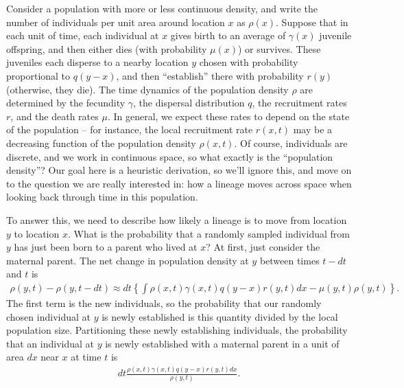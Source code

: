 \documentclass{article}
\begin{document}
Consider a population with more or less continuous density,
and write the number of individuals per unit area around location $x$ as $\rho(x)$.
Suppose that in each unit of time, each individual at $x$ 
gives birth to an average of $\gamma(x)$ juvenile offspring,
and then either dies (with probability $\mu(x)$) or survives.
These juveniles each disperse to a nearby location $y$
chosen with probability proportional to $q(y-x)$,
and then ``establish'' there with probability $r(y)$ (otherwise, they die).
The time dynamics of the population density $\rho$
are determined by the fecundity $\gamma$, the dispersal distribution $q$,
the recruitment rates $r$, and the death rates $\mu$.
In general, we expect these rates to depend on the state of the population
-- for instance, the local recruitment rate $r(x, t)$ may be a decreasing function
of the population density $\rho(x, t)$.
Of course, individuals are discrete, and we work in continuous space,
so what exactly is the ``population density''?
Our goal here is a heuristic derivation, so we'll ignore this,
and move on to the question we are really interested in:
how a lineage moves across space when looking back through time in this population.

To answer this, we need to describe how likely a lineage is to move from location $y$ to location $x$.
What is the probability that a randomly sampled individual from $y$
has just been born to a parent who lived at $x$?
At first, just consider the maternal parent.
The net change in population density at $y$ between times $t - dt$ and $t$ is
\begin{align*}
    \rho(y, t) - \rho(y, t - dt)
    \approx
    dt \left\{
        \int \rho(x, t) \gamma(x, t) q(y - x) r(y, t) dx - \mu(y, t) \rho(y, t) 
    \right\} .
\end{align*}
The first term is the new individuals,
so the probability that our randomly chosen individual at $y$ is newly established is
this quantity divided by the local population size.
Partitioning these newly establishing individuals,
the probability that an individual at $y$ is newly established
with a maternal parent in a unit of area $dx$ near $x$ at time $t$ is
\begin{align*}
    dt \frac{
        \rho(x, t) \gamma(x, t) q(y - x) r(y, t) dx
    }{ \rho(y, t) } .
\end{align*}
\end{document}
